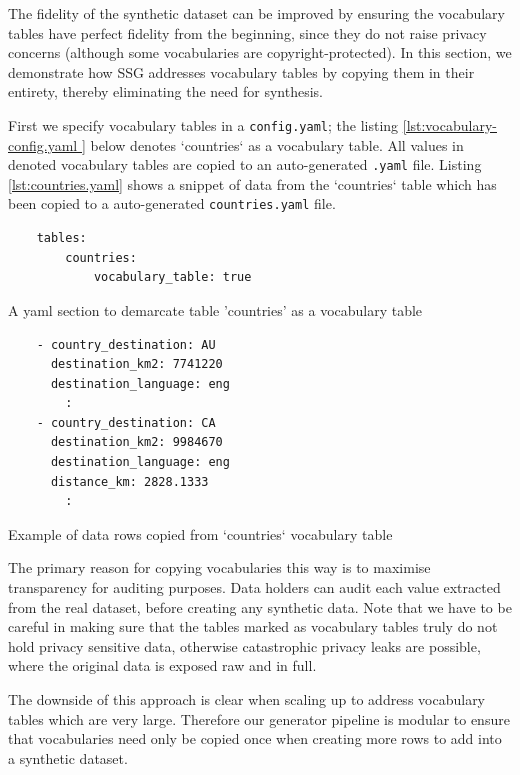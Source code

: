 \documentclass[11pt]{article}
\begin{document}
The fidelity of the synthetic dataset can be improved by ensuring the vocabulary tables have perfect fidelity from the beginning, since they do not raise privacy concerns (although some vocabularies are copyright-protected). In this section, we demonstrate how SSG addresses vocabulary tables by copying them in their entirety, thereby eliminating the need for synthesis.

First we specify vocabulary tables in a \texttt{config.yaml}; the listing \ref{lst:vocabulary-config.yaml } below denotes `countries` as a vocabulary table. All values in denoted vocabulary tables are copied to an auto-generated \texttt{.yaml} file. Listing \ref{lst:countries.yaml} shows a snippet of data from the `countries` table which has been copied to a auto-generated \texttt{countries.yaml} file.

\begin{listing}[H]
\begin{verbatim}
    tables:
        countries:
            vocabulary_table: true
\end{verbatim}
\caption{A yaml section to demarcate table 'countries' as a vocabulary table}
\label{lst:vocabulary-config.yaml }
\end{listing}

\begin{listing}[H]
\begin{verbatim}
    - country_destination: AU
      destination_km2: 7741220
      destination_language: eng
        :
    - country_destination: CA
      destination_km2: 9984670
      destination_language: eng
      distance_km: 2828.1333
        :
\end{verbatim}
\caption{Example of data rows copied from `countries` vocabulary table}
\label{lst:countries.yaml}
\end{listing}

The primary reason for copying vocabularies this way is to maximise transparency for auditing purposes. Data holders can audit each value extracted from the real dataset, before creating any synthetic data. Note that we have to be careful in making sure that the tables marked as vocabulary tables truly do not hold privacy sensitive data, otherwise catastrophic privacy leaks are possible, where the original data is exposed raw and in full. 

The downside of this approach is clear when scaling up to address vocabulary tables which are very large. Therefore our generator pipeline is modular to ensure that vocabularies need only be copied once when creating more rows to add into a synthetic dataset. 
\end{document}
